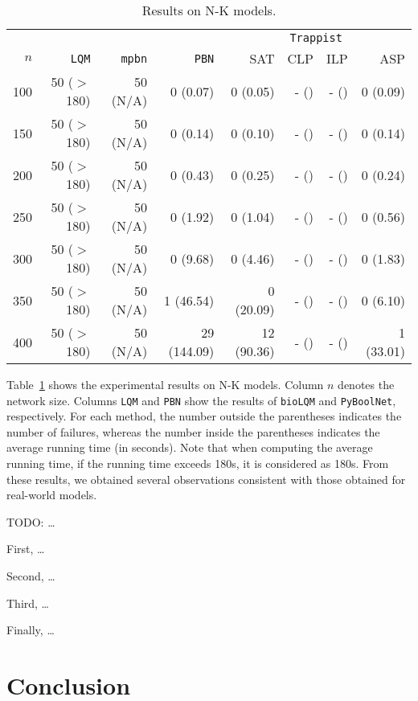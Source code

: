 \documentclass[preprint,12pt]{elsarticle}
\begin{document}
\begin{table}[!htb]
  \caption{Results on N-K models.}
  \centering%
  \label{tab:result_N_K}
  \begin{tabular}{rrrrrrrr}
    \toprule
    & & & & \multicolumn{4}{c}{\texttt{Trappist}}\\
    \cmidrule(rr){5-8}
    \(n\) & \texttt{LQM} & \texttt{mpbn} & \texttt{PBN} & SAT & CLP & ILP & ASP \\
    \midrule
    100 & 50 ($>$ 180) & 50 (N/A) & 0 (0.07) & 0 (0.05) & - () & - () & 0 (0.09) \\
    150 & 50 ($>$ 180) & 50 (N/A) & 0 (0.14) & 0 (0.10) & - () & - () & 0 (0.14) \\
    200 & 50 ($>$ 180) & 50 (N/A) & 0 (0.43) & 0 (0.25) & - () & - () & 0 (0.24) \\
    250 & 50 ($>$ 180) & 50 (N/A) & 0 (1.92) & 0 (1.04) & - () & - () & 0 (0.56) \\
    300 & 50 ($>$ 180) & 50 (N/A) & 0 (9.68) & 0 (4.46) & - () & - () & 0 (1.83) \\
    350 & 50 ($>$ 180) & 50 (N/A) & 1 (46.54) & 0 (20.09) & - () & - () & 0 (6.10) \\
    400 & 50 ($>$ 180) & 50 (N/A) & 29 (144.09) & 12 (90.36) & - () & - () & 1 (33.01) \\
    \bottomrule
  \end{tabular}
\end{table}

Table~\ref{tab:result_N_K} shows the experimental results on N-K models.
Column \(n\) denotes the network size.
Columns \texttt{LQM} and \texttt{PBN} show the results of \texttt{bioLQM} and \texttt{PyBoolNet}, respectively.
For each method, the number outside the parentheses indicates the number of failures, whereas the number inside the parentheses indicates the average running time (in seconds).
Note that when computing the average running time, if the running time exceeds 180s, it is considered as 180s.
From these results, we obtained several observations consistent with those obtained for real-world models.

TODO: \dots

First, \dots

Second, \dots

Third, \dots

Finally, \dots

\section{Conclusion}
\label{sec:Conclusion}
\end{document}
